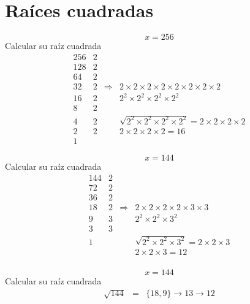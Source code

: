 \documentclass{beamer}
\begin{document}
\section{Raíces cuadradas}
\begin{frame}
\begin{equation}
x = 256
\end{equation}
Calcular su raíz cuadrada
\begin{equation}
\begin{array}{l|rcl}
256 & 2 \\
\hline
128 & 2\\
64 & 2\\
32 & 2 & \Rightarrow & 2 \times 2\times 2\times 2\times 2\times 2\times 2\times 2\\
16 & 2 & & 2^2 \times2^2 \times2^2 \times2^2 \\
8 & 2 & & \\
4 & 2& & \sqrt{2^2 \times2^2 \times2^2 \times2^2} = 2\times 2\times 2\times 2\\
2 & 2& & 2\times 2\times 2\times 2 = 16\\
1
\end{array}
\end{equation}
\end{frame}

\begin{frame}
\begin{equation}
x = 144
\end{equation}
Calcular su raíz cuadrada
\begin{equation}
\begin{array}{l|rcl}
144 & 2 \\
\hline
72 & 2\\
36 & 2\\
18 & 2 & \Rightarrow & 2 \times 2\times 2\times 2\times 3\times 3\\
9 & 3 & & 2^2 \times2^2 \times3^2 \\
3 & 3 & & \\
1 & & & \sqrt{2^2 \times2^2 \times3^2 } = 2\times 2\times 3\\
 & & & 2\times 2\times 3 = 12\\

\end{array}
\end{equation}
\end{frame}

\begin{frame}
\begin{equation}
x = 144
\end{equation}
Calcular su raíz cuadrada
\begin{equation}
\begin{array}{rcl}
\sqrt{144} & = & \{18,9\}\rightarrow 13 \rightarrow 12
\end{array}
\end{equation}
\end{frame}
\end{document}
